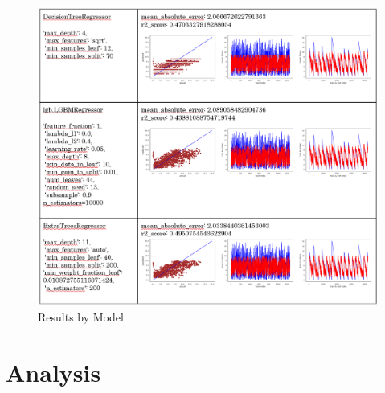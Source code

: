 \documentclass[]{llncs}
\begin{document}
\begin{figure}
	\centering
	\includegraphics[width=1\linewidth]{../GPUProject/Results2.PNG}
	\caption{Results by Model}
	\label{fig:morethan90percent}
\end{figure}

\section{Analysis}
\end{document}
